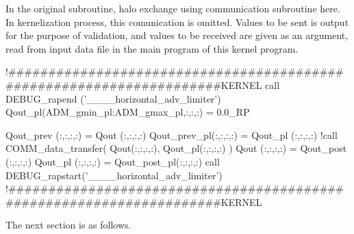 In the original subroutine, halo exchange using communication subroutine
 here.
%
In kernelization process, this comunication is omitted.
%
Values to be sent is output for the purpose of validation, and values to
be received are given as an argument, read from input data file in the
main program of this kernel program.

\begin{LstF90}[name=horizontal_limiter_thuburn,firstnumber=last]
  !#####################################################################KERNEL
  call DEBUG_rapend  ('____horizontal_adv_limiter')
  Qout_pl(ADM_gmin_pl:ADM_gmax_pl,:,:,:) = 0.0_RP

  Qout_prev   (:,:,:,:) = Qout        (:,:,:,:)
  Qout_prev_pl(:,:,:,:) = Qout_pl     (:,:,:,:)
  !call COMM_data_transfer( Qout(:,:,:,:), Qout_pl(:,:,:,:) )
  Qout        (:,:,:,:) = Qout_post   (:,:,:,:)
  Qout_pl     (:,:,:,:) = Qout_post_pl(:,:,:,:)
  call DEBUG_rapstart('____horizontal_adv_limiter')
  !#####################################################################KERNEL

\end{LstF90}

The next section is as follows.

